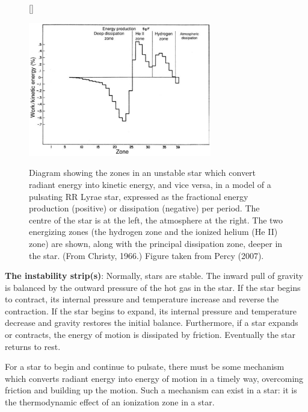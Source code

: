 \documentclass[a4paper,10pt]{article}
\begin{document}
\begin{figure}[t]
    [\FBwidth]
    {\caption{\footnotesize{Diagram showing the zones in an unstable star which convert radiant energy into kinetic energy, and vice versa, in a model of a pulsating RR Lyrae star, expressed as the fractional energy production (positive) or dissipation (negative) per period. The centre of the star is at the left, the atmosphere at the right. The two energizing zones (the hydrogen zone and the ionized helium (He II) zone) are shown, along with the principal dissipation zone, deeper in the star. (From Christy, 1966.) Figure taken from Percy (2007).}}
    \label{fig:variablezones}}
    {\includegraphics[width=8cm]{figures/VariableZones.png}}
\end{figure}

{\noindent}\textbf{The instability strip(s)}: Normally, stars are stable. The inward pull of gravity is balanced by the outward pressure of the hot gas in the star. If the star begins to contract, its internal pressure and temperature increase and reverse the contraction. If the star begins to expand, its internal pressure and temperature decrease and gravity restores the initial balance. Furthermore, if a star expands or contracts, the energy of motion is dissipated by friction. Eventually the star returns to rest.

{\noindent}For a star to begin and continue to pulsate, there must be some mechanism which converts radiant energy into energy of motion in a timely way, overcoming friction and building up the motion. Such a mechanism can exist in a star: it is the thermodynamic effect of an ionization zone in a star.
\end{document}
